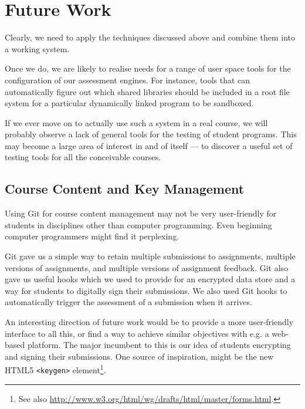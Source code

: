 
\section{Future Work}

Clearly, we need to apply the techniques discussed above and combine them into
a working system.

Once we do, we are likely to realise needs for a range of user space tools for
the configuration of our assessment engines. For instance, tools that can
automatically figure out which shared libraries should be included in a root
file system for a particular dynamically linked program to be sandboxed.

If we ever move on to actually use such a system in a real course, we will
probably observe a lack of general tools for the testing of student programs.
This may become a large area of interest in and of itself --- to discover a
useful set of testing tools for all the conceivable courses.

\subsection{Course Content and Key Management}

Using Git for course content management may not be very user-friendly for
students in disciplines other than computer programming. Even beginning
computer programmers might find it perplexing.

Git gave us a simple way to retain multiple submissions to assignments,
multiple versions of assignments, and multiple versions of assignment feedback.
Git also gave us useful hooks which we used to provide for an encrypted data
store and a way for students to digitally sign their submissions. We also used
Git hooks to automatically trigger the assessment of a submission when it
arrives.

An interesting direction of future work would be to provide a more
user-friendly interface to all this, or find a way to achieve similar
objectives with e.g. a web-based platform. The major incumbent to this is our
idea of students encrypting and signing their submissions. One source of
inspiration, might be the new HTML5 \texttt{<keygen>} element\footnote{See also
\url{http://www.w3.org/html/wg/drafts/html/master/forms.html}.}.

